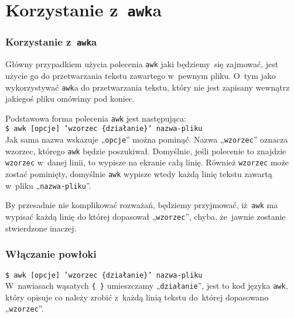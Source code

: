 \documentclass[10pt,t]{beamer}
\begin{document}
\section{Korzystanie z~\texttt{awk}a}


\begin{frame}
  \frametitle{Korzystanie z~\texttt{awk}a}


  Główny przypadkiem użycia polecenia \texttt{awk} jaki będziemy~się
  zajmować, jest użycie go do przetwarzania tekstu zawartego w~pewnym pliku.
  O~tym jako wykorzystywać \texttt{awk}a do przetwarzania tekstu, który
  nie jest zapisany wewnątrz jakiegoś pliku omówimy pod koniec.

  Podstawowa forma polecenia \texttt{awk} jest następująca: \\
  \texttt{\$ awk [opcje] 'wzorzec \{działanie\}' nazwa-pliku} \\
  Jak sama nazwa wskazuje „\texttt{opcje}” można pominąć. Nazwa
  „\texttt{wzorzec}” oznacza wzorzec, którego \texttt{awk} będzie
  poszukiwał. Domyślnie, jeśli polecenie to znajdzie \texttt{wzorzec}
  w~danej linii, to wypisze na ekranie całą linię. Również \texttt{wzorzec}
  może zostać pominięty, domyślnie \texttt{awk} wypisze wtedy każdą linię
  tekstu zawartą w~pliku „\texttt{nazwa-pliku}”.

  By przesadnie nie komplikować rozważań, będziemy przyjmować,
  iż~\texttt{awk} ma wypisać każdą linię do której dopasował
  „\texttt{wzorzec}”, chyba, że~jawnie zostanie stwierdzone inaczej.

\end{frame}





\begin{frame}
  \frametitle{Włączanie powłoki}


  \texttt{\$ awk [opcje] 'wzorzec \{działanie\}' nazwa-pliku} \\
  W~nawiasach wąsatych \texttt{\{ \}} umieszczamy „\texttt{działanie}”, jest
  to kod języka \texttt{awk}, który opisuje co należy zrobić z~każdą linią
  tekstu do~której dopasowano „\texttt{wzorzec}”.




\end{frame}
\end{document}

